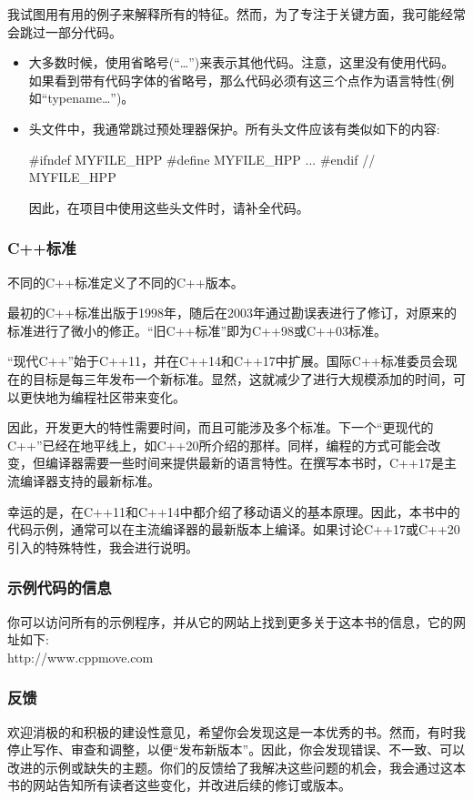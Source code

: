 我试图用有用的例子来解释所有的特征。然而，为了专注于关键方面，我可能经常会跳过一部分代码。

\begin{itemize}
\item 大多数时候，使用省略号(“…”)来表示其他代码。注意，这里没有使用代码。如果看到带有代码字体的省略号，那么代码必须有这三个点作为语言特性(例如“typename…”)。
\item 头文件中，我通常跳过预处理器保护。所有头文件应该有类似如下的内容:
\begin{cppcode}
#ifndef MYFILE_HPP
#define MYFILE_HPP
...
#endif // MYFILE_HPP
\end{cppcode}
	因此，在项目中使用这些头文件时，请补全代码。
\end{itemize}

\subsubsection{C++标准}

不同的C++标准定义了不同的C++版本。

最初的C++标准出版于1998年，随后在2003年通过勘误表进行了修订，对原来的标准进行了微小的修正。“旧C++标准”即为C++98或C++03标准。

“现代C++”始于C++11，并在C++14和C++17中扩展。国际C++标准委员会现在的目标是每三年发布一个新标准。显然，这就减少了进行大规模添加的时间，可以更快地为编程社区带来变化。

因此，开发更大的特性需要时间，而且可能涉及多个标准。下一个“更现代的C++”已经在地平线上，如C++20所介绍的那样。同样，编程的方式可能会改变，但编译器需要一些时间来提供最新的语言特性。在撰写本书时，C++17是主流编译器支持的最新标准。

幸运的是，在C++11和C++14中都介绍了移动语义的基本原理。因此，本书中的代码示例，通常可以在主流编译器的最新版本上编译。如果讨论C++17或C++20引入的特殊特性，我会进行说明。

\subsubsection{示例代码的信息}

你可以访问所有的示例程序，并从它的网站上找到更多关于这本书的信息，它的网址如下:\\http://www.cppmove.com

\subsubsection{反馈}

欢迎消极的和积极的建设性意见，希望你会发现这是一本优秀的书。然而，有时我停止写作、审查和调整，以便“发布新版本”。因此，你会发现错误、不一致、可以改进的示例或缺失的主题。你们的反馈给了我解决这些问题的机会，我会通过这本书的网站告知所有读者这些变化，并改进后续的修订或版本。

